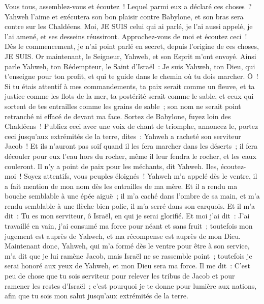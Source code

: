 \begin{multicols}{2}
Vous tous, assemblez-vous et écoutez~! Lequel parmi eux a déclaré ces choses~? Yahweh l'aime et exécutera son bon plaisir contre Babylone, et son bras sera contre sur les Chaldéens.
Moi, JE SUIS celui qui ai parlé, je l'ai aussi appelé, je l'ai amené, et ses desseins réussiront.
Approchez-vous de moi et écoutez ceci~! Dès le commencement, je n'ai point parlé en secret, depuis l'origine de ces choses, JE SUIS. Or maintenant, le Seigneur, Yahweh, et son Esprit m'ont envoyé.
Ainsi parle Yahweh, ton Rédempteur, le Saint d'Israël~: Je suis Yahweh, ton Dieu, qui t'enseigne pour ton profit, et qui te guide dans le chemin où tu dois marcher.
Ô~! Si tu étais attentif à mes commandements, ta paix serait comme un fleuve, et ta justice comme les flots de la mer,
ta postérité serait comme le sable, et ceux qui sortent de tes entrailles comme les grains de sable~; son nom ne serait point retranché ni effacé de devant ma face.
Sortez de Babylone, fuyez loin des Chaldéens~! Publiez ceci avec une voix de chant de triomphe, annoncez le, portez ceci jusqu'aux extrémités de la terre, dites~: Yahweh a racheté son serviteur Jacob~!
Et ils n'auront pas soif quand il les fera marcher dans les déserts~; il fera découler pour eux l'eau hors du rocher, même il leur fendra le rocher, et les eaux couleront.
Il n'y a point de paix pour les méchants, dit Yahweh.
\VerseOne{}Iles, écoutez-moi~! Soyez attentifs, vous peuples éloignés~! Yahweh m'a appelé dès le ventre, il a fait mention de mon nom dès les entrailles de ma mère.
Et il a rendu ma bouche semblable à une épée aiguë~; il m'a caché dans l'ombre de sa main, et m'a rendu semblable à une flèche bien polie, il m'a serré dans son carquois.
Et il m'a dit~: Tu es mon serviteur, ô Israël, en qui je serai glorifié.
Et moi j'ai dit~: J'ai travaillé en vain, j'ai consumé ma force pour néant et sans fruit~; toutefois mon jugement est auprès de Yahweh, et ma récompense est auprès de mon Dieu.
Maintenant donc, Yahweh, qui m'a formé dès le ventre pour être à son service, m'a dit que je lui ramène Jacob, mais Israël ne se rassemble point~; toutefois je serai honoré aux yeux de Yahweh, et mon Dieu sera ma force.
Il me dit~: C'est peu de chose que tu sois serviteur pour relever les tribus de Jacob et pour ramener les restes d'Israël~; c'est pourquoi je te donne pour lumière aux nations, afin que tu sois mon salut jusqu'aux extrémités de la terre.

\end{multicols}
